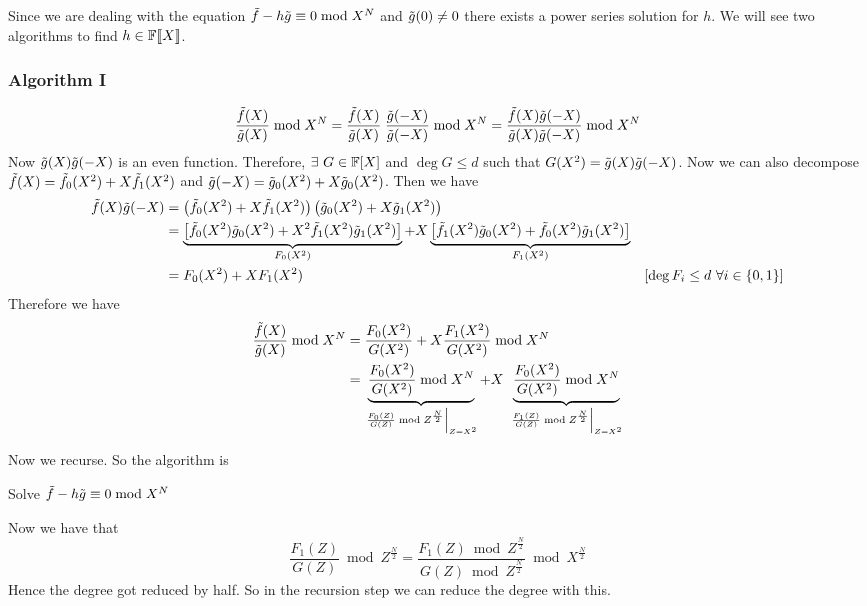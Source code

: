 Since we are dealing with the equation $\tilde{f}-h\tilde{g}\equiv 0\bmod{X^N}$ and $\tilde{g}(0)\neq 0$ there exists a power series solution for $h$. We will see two algorithms to find $h\in \mathbb{F}\llbracket X\rrbracket$.

\subsubsection{Algorithm I}
 \begin{align*}
 	\frac{\tilde{f}(X)}{\tilde{g}(X)}\bmod{X^N}  = \frac{\tilde{f}(X)}{\tilde{g}(X)}\;\frac{\tilde{g}(-X)}{\tilde{g}(-X)}\bmod{X^N} = \frac{\tilde{f}(X)\tilde{g}(-X)}{\tilde{g}(X)\tilde{g}(-X)}\bmod{X^N}
 \end{align*}Now $\tilde{g}(X)\tilde{g}(-X)$ is an even function. Therefore, $\exists\ G\in\mathbb{F}[X]$ and $\deg G\leq d$ such that $G(X^2)=\tilde{g}(X)\tilde{g}(-X)$. Now we can also decompose $\tilde{f}(X)=\tilde{f}_0(X^2)+X\tilde{f}_1(X^2)$ and $\tilde{g}(-X)=\tilde{g}_0(X^2)+X\tilde{g}_0(X^2)$. Then we have 
\begin{align*}
	 \tilde{f}(X)\tilde{g}(-X) & = \left(\tilde{f}_0(X^2)+X\tilde{f}_1(X^2)\right)\left(\tilde{g}_0(X^2)+X\tilde{g}_1(X^2)\right)\\
	 & = \underbrace{\left[ \tilde{f}_0(X^2)\tilde{g}_0(X^2)+X^2\tilde{f}_1(X^2)\tilde{g}_1(X^2)\right]}_{F_0(X^2)}+X\underbrace{\left[\tilde{f}_1(X^2)\tilde{g}_0(X^2)+\tilde{f}_0(X^2)\tilde{g}_1(X^2)\right]}_{F_1(X^2)}\\
	 &=F_0(X^2)+XF_1(X^2) & [\deg F_i\leq d\ \forall i\in\{0,1\}]
\end{align*}Therefore we have \begin{align*}
\frac{\tilde{f}(X)}{\tilde{g}(X)}\bmod{X^N}  & = \frac{F_0(X^2)}{G(X^2)}+X\frac{F_1(X^2)}{G(X^2)}\bmod{X^N} \\
	& = \underbrace{\frac{F_0(X^2)}{G(X^2)}\bmod{X^N}}_{\left.\frac{F_0(Z)}{G(Z)}\bmod{Z^{\frac{N}2}}\right|_{Z=X^2}}+X\;\underbrace{\frac{F_0(X^2)}{G(X^2)}\bmod{X^N}}_{\left.\frac{F_1(Z)}{G(Z)}\bmod{Z^{\frac{N}2}}\right|_{Z=X^2}}
\end{align*}

Now we recurse. So the algorithm is
\begin{algorithm}
	\DontPrintSemicolon
	\caption{Solve $\tilde{f}-h\tilde{g}\equiv 0\bmod {X^N}$}
\end{algorithm}

Now we have that $$\frac{F_1(Z)}{G(Z)}\bmod{Z^{\frac{N}2}}=\frac{F_1(Z)\bmod{Z^{\frac{N}2}}}{G(Z)\bmod{Z^{\frac{N}2}}}\bmod{X^{\frac{N}2}}$$Hence the degree got reduced by half. So in the recursion step we can reduce the degree with this. \parinf\vspace{5mm}

